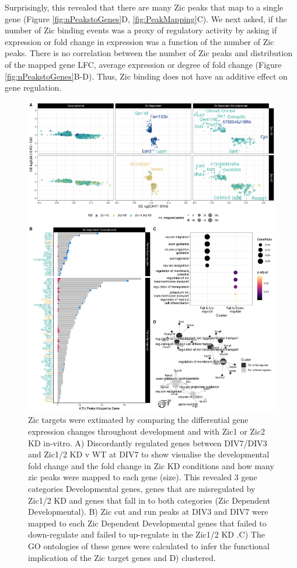 \documentclass[fleqn,10pt,twocolumn]{wlscirep}
\begin{document}
Surprisingly, this revealed that there are many Zic peaks that map to a single gene (Figure \ref{fig:nPeakstoGenes}D, \ref{fig:PeakMapping}C). We next asked, if the number of Zic binding events was a proxy of regulatory activity by asking if expression or fold change in expression was a function of the number of Zic peaks. There is no correlation between the number of Zic peaks and distribution of the mapped gene LFC, average expression or degree of fold change (Figure \ref{fig:nPeakstoGenes}B-D). Thus, Zic binding does not have an additive effect on gene regulation. 

\begin{figure}[!ht]
\includegraphics[width=.95\textwidth]{../figures/figure4.png}
\caption{Zic targets were extimated by comparing the differential gene expression changes throughout development and with Zic1 or Zic2 KD in-vitro. A) Discordantly regulated genes between DIV7/DIV3 and Zic1/2 KD v WT at DIV7  to show visualise the developmental fold change and the fold change in Zic KD conditions and how many zic peaks were mapped to each gene (size). This revealed 3 gene categories Developmental genes, genes that are misregulated by Zic1/2 KD and genes that fall in to both categories (Zic Dependent Developmental). B) Zic cut and run peaks at DIV3 and DIV7 were mapped to each Zic Dependent Developmental genes that failed to down-regulate and failed to up-regulate in the Zic1/2 KD .C) The GO ontologies of these genes were calculated to infer the functional implication of the Zic target genes and D) clustered. }
\label{fig:ZicKD}
\end{figure}
\end{document}
